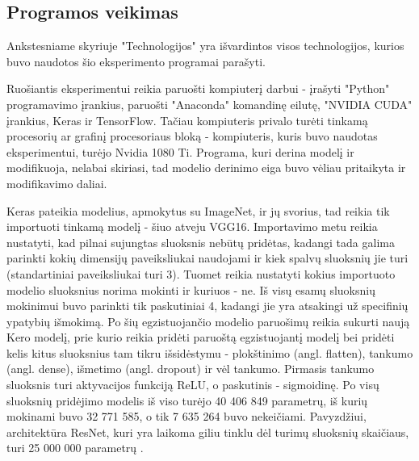 \documentclass{VUMIFPSkursinis}
\begin{document}

\subsection{Programos veikimas}
Ankstesniame skyriuje "Technologijos" yra išvardintos visos technologijos, kurios buvo naudotos šio eksperimento programai parašyti.

Ruošiantis eksperimentui reikia paruošti kompiuterį darbui - įrašyti "Python" programavimo įrankius, paruošti "Anaconda" komandinę eilutę, "NVIDIA CUDA" įrankius, Keras ir 
TensorFlow. Tačiau kompiuteris privalo turėti tinkamą procesorių ar grafinį procesoriaus bloką - kompiuteris, kuris buvo naudotas eksperimentui, turėjo Nvidia 1080 Ti. Programa, kuri 
derina modelį ir modifikuoja, nelabai skiriasi, tad modelio derinimo eiga buvo vėliau pritaikyta ir modifikavimo daliai. 
 
Keras pateikia modelius, apmokytus su ImageNet, ir jų svorius, tad reikia tik importuoti 
tinkamą modelį - šiuo atveju VGG16. Importavimo metu reikia nustatyti, kad pilnai sujungtas sluoksnis nebūtų pridėtas, kadangi tada galima parinkti kokių dimensijų 
paveiksliukai naudojami ir kiek spalvų sluoksnių jie turi (standartiniai paveiksliukai turi 3). Tuomet reikia nustatyti kokius importuoto modelio sluoksnius norima 
mokinti ir kuriuos - ne. Iš visų esamų sluoksnių mokinimui buvo parinkti tik paskutiniai 4, kadangi jie yra atsakingi už specifinių ypatybių išmokimą. Po šių egzistuojančio 
modelio paruošimų reikia sukurti naują Kero modelį, prie kurio reikia pridėti paruoštą egzistuojantį modelį bei pridėti kelis kitus sluoksnius tam tikru išsidėstymu - 
plokštinimo (angl. flatten), tankumo (angl. dense), išmetimo (angl. dropout) ir vėl tankumo. Pirmasis tankumo sluoksnis turi aktyvacijos funkciją ReLU, o paskutinis - sigmoidinę. Po visų sluoksnių pridėjimo modelis iš 
viso turėjo 40 406 849 parametrų, iš kurių mokinami buvo 32 771 585, o tik 7 635 264 buvo nekeičiami. Pavyzdžiui, architektūra ResNet, kuri yra laikoma giliu tinklu dėl turimų sluoksnių skaičiaus, turi 25 000 000 parametrų \cite{DBLP:journals/corr/HeZRS15}.
\end{document}
